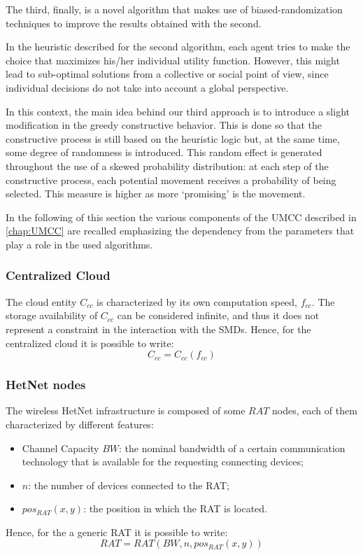 \documentclass[twoside,openright]{report}
\begin{document}
The third, finally, is a novel algorithm that makes use of biased-randomization techniques \cite{Juan2011} to improve the results obtained with the second.
 
In the heuristic described for the second algorithm, each agent tries to make the choice that maximizes his/her individual utility function.
However, this might lead to sub-optimal solutions from a collective or social point of view, since individual decisions do not take into account a global perspective.
 
In this context, the main idea behind our third approach is to introduce a slight modification in the greedy constructive behavior. 
This is done so that the constructive process is still based on the heuristic logic but, at the same time, some degree of randomness is introduced. 
This random effect is generated throughout the use of a skewed probability distribution: at each step of the constructive process, each potential movement receives a probability of being selected. This measure is higher as more `promising' is the movement. 

In the following of this section the various components of the \gls{UMCC} described in \autoref{chap:UMCC} are recalled emphasizing the dependency from the parameters that play a role in the used algorithms.
 
\subsubsection{Centralized Cloud}   
The cloud entity $C_\textit{cc}$ is characterized by its own computation speed, $f_\textit{cc}$. The storage availability of $C_\textit{cc}$ can be considered infinite, and thus it does not represent a constraint in the interaction with the \glspl{SMD}. Hence, for the centralized cloud it is possible to write:
\begin{equation}
\label{Ccc-5}
C_{\textit{cc}} = C_{\textit{cc}}(f_{\textit{cc}})
\end{equation} 
\subsubsection{HetNet nodes}   
The wireless \gls{HetNet} infrastructure is composed of some $\textit{RAT}$ nodes, each of them characterized by different features: 
\begin{itemize}
\item{Channel Capacity $\textit{BW}$: the nominal bandwidth of a certain communication technology that is available for the requesting connecting devices;}
\item{$n$: the number of devices connected to the \gls{RAT};}
\item{$pos_{RAT}(x,y)$: the position in which the \gls{RAT} is located.}
\end{itemize}
Hence, for the a generic \gls{RAT} it is possible to write:
\begin{equation}
\label{RAT-5}
\textit{RAT} = \textit{RAT}(\textit{BW}, n, pos_\textit{RAT}(x,y))
\end{equation} 
\end{document}
